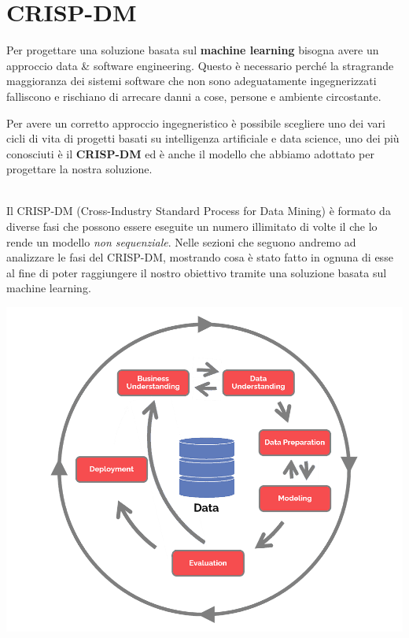 \documentclass[a4paper, 11pt, oneside]{report}
\begin{document}
            \section{CRISP-DM}
            Per progettare una soluzione basata sul \textbf{machine learning} bisogna avere un approccio data \& software
            engineering.
            Questo è necessario perché la stragrande maggioranza dei sistemi software che non sono adeguatamente ingegnerizzati
            falliscono e rischiano di arrecare danni a cose, persone e ambiente circostante.
            \par \noindent Per avere un corretto approccio ingegneristico è possibile scegliere uno dei vari cicli di vita
            di progetti basati su intelligenza artificiale e data science, uno dei più conosciuti è il \textbf{CRISP-DM} ed è anche
            il modello che abbiamo adottato per progettare la nostra soluzione.
            \par \noindent
            \\ \noindent Il CRISP-DM (Cross-Industry Standard Process for Data Mining) è formato da diverse fasi che possono
            essere eseguite un numero illimitato di volte il che lo rende un modello \textit{non sequenziale}.
            Nelle sezioni che seguono andremo ad analizzare le fasi del CRISP-DM, mostrando cosa è stato fatto in ognuna di esse
            al fine di poter raggiungere il nostro obiettivo tramite una soluzione basata sul machine learning.
            \par \noindent
            \begin{center}
                \includegraphics[scale=0.3]{CRISP-DM}
            \end{center}
\end{document}

